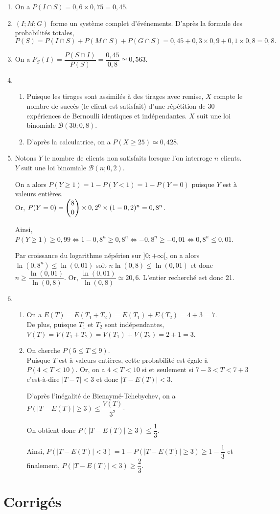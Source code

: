 \documentclass[11pt,fleqn, openany]{book} %
\begin{document}
\begin{solution}
\begin{enumerate}
\item On a $P(I \cap S)=0,6 \times 0,75 = 0,45$.

\item $(I;M;G)$ forme un système complet d'événements. D'après la formule des probabilités totales,
\[P(S)=P(I\cap S)+P(M\cap S)+P(G\cap S)=0,45+0,3 \times 0,9+0,1 \times 0,8 = 0,8.\]
\item On a $P_S(I)=\dfrac{P(S \cap I)}{P(S)}=\dfrac{0,45}{0,8}\simeq 0,563$.
\item \begin{enumerate}
\item Puisque les tirages sont assimilés à des tirages avec remise, $X$ compte le nombre de succès (le client est satisfait) d'une répétition de 30 expériences de Bernoulli identiques et indépendantes. $X$ suit une loi binomiale $\mathcal{B}\left(30;0,8\right)$.
\item D'après la calculatrice, on a $P(X \geqslant 25) \simeq 0,428$.
\end{enumerate}
\item Notons $Y$ le nombre de clients non satisfaits lorsque l'on interroge $n$ clients.\\ $Y$ suit une loi binomiale $\mathcal{B}(n;0,2)$.

On a alors $P(Y \geqslant 1)=1-P(Y <1)=1-P(Y=0)$ puisque $Y$ est à valeurs entières.\\ Or, $P(Y=0)=\dbinom{8}{0} \times 0,2 ^0 \times (1-0,2)^n=0,8^n$.

Ainsi, $P(Y \geqslant 1) \geqslant 0,99 \Leftrightarrow  1-0,8^n \geqslant 0,8^n \Leftrightarrow -0,8^n \geqslant -0,01 \Leftrightarrow 0,8^n \leqslant 0,01$.

Par croissance du logarithme népérien sur $]0;+\infty[$, on a alors $\ln(0,8^n) \leqslant \ln(0,01)$ soit $n\ln(0,8) \leqslant \ln(0,01)$ et donc $n \geqslant \dfrac{\ln(0,01)}{\ln(0,8)}$. Or, $\dfrac{\ln(0,01)}{\ln(0,8)}\simeq 20,6$. L'entier recherché est donc 21.
\item \begin{enumerate}
\item On a $E(T)=E(T_1+T_2)=E(T_1)+E(T_2)=4+3=7$.\\ De plus, puisque $T_1$ et $T_2$ sont indépendantes, $V(T)=V(T_1+T_2)=V(T_1)+V(T_2)=2+1=3$.
\item On cherche $P(5 \leqslant T \leqslant 9)$.\\ Puisque $T$ est à valeurs entières, cette probabilité est égale à $P(4<T<10)$. Or, on a $4<T<10$ si et seulement si $7-3<T<7+3$ c'est-à-dire $|T-7|<3$ et donc $|T-E(T)|<3$.

D'après l'inégalité de Bienaymé-Tchebychev, on a $P(|T-E(T)| \geqslant 3) \leqslant \dfrac{V(T)}{3^2}$.

On obtient donc $P(|T-E(T)| \geqslant 3) \leqslant \dfrac{1}{3}$.

Ainsi, $P(|T-E(T)|<3)=1-P(|T-E(T)| \geqslant 3) \geqslant 1- \dfrac{1}{3}$ et finalement, $P(|T-E(T)|<3) \geqslant \dfrac{2}{3}$.
\end{enumerate}
\end{enumerate}
\end{solution}




\chapter{Corrigés}


\printsolutions[headings={false} ]
\end{document}
